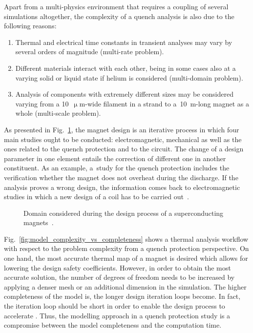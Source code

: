 Apart from a multi-physics environment that requires a coupling of several simulations altogether, the complexity of a quench analysis is also due to the following reasons: 
\begin{enumerate}
    \item Thermal and electrical time constants in transient analyses may vary by several orders of magnitude (multi-rate problem).
    \item Different materials interact with each other, being in some cases also at a varying solid or liquid state if helium is considered (multi-domain problem).
    \item Analysis of components with extremely different sizes may be considered varying from a 10~$\upmu$m-wide filament in a strand to a~10~m-long magnet as a whole (multi-scale problem).
\end{enumerate}

As presented in Fig.~\ref{fig:magnet_design_domains}, the magnet design is an iterative process in which four main studies ought to be conducted: electromagnetic, mechanical as well as the ones related to the quench protection and to the circuit. The change of a design parameter in one element entails the correction of different one in another constituent. As an example, a~study for the quench protection includes the verification whether the magnet does not overheat during the discharge. If the analysis proves a wrong design, the information comes back to electromagnetic studies in which a new design of a coil has to be carried out~\cite{quench_protection_system_applied_prioli}.

\begin{figure}[H]
    \centering
    \caption{Domain considered during the design process of a superconducting magnets~\cite{quench_protection_system_applied_prioli}.}
    \label{fig:magnet_design_domains}
\end{figure}

Fig.~\ref{fig:model_complexity_vs_completeness} shows a thermal analysis workflow with respect to the problem complexity from a quench protection perspective. On one hand, the most accurate thermal map of a magnet is desired which allows for lowering the design safety coefficients. However, in order to obtain the most accurate solution, the number of degrees of freedom needs to be increased by applying a denser mesh or an additional dimension in the simulation. The higher completeness of the model is, the longer design iteration loops become. In fact, the iteration loop should be short in order to enable the design process to accelerate . Thus, the modelling approach in a quench protection study is a compromise between the model completeness and the computation time.

